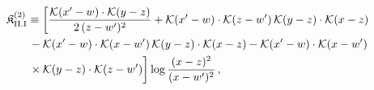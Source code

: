\begingroup\small
\begin{align}\label{eq:K-2_rm_II_I}
&\mathfrak{K}^{(2)}_{\rm II.I}\equiv \bigg[\frac{\mathcal{K}(x'-w)\cdot\mathcal{K}(y-z)}{2\,(z-w')^{2}} +\mathcal{K}(x'-w)\cdot\mathcal{K}(z-w')\, \mathcal{K}(y-z)\cdot\mathcal{K}(x-z)\notag\\
&\quad\quad -\mathcal{K}(x'-w)\cdot\mathcal{K}(x-w')\, \mathcal{K}(y-z)\cdot\mathcal{K}(x-z) -\mathcal{K}(x'-w)\cdot\mathcal{K}(x-w')\notag\\
&\quad\quad \times \mathcal{K}(y-z)\cdot\mathcal{K}(z-w')\bigg]\log\frac{(x-z)^{2}}{(x-w')^{2}}\,,
\end{align}
\endgroup
